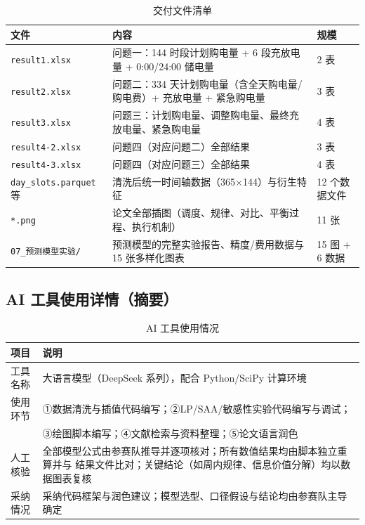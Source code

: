 \documentclass[withoutpreface,bwprint]{cumcmthesis}
\begin{document}
\begin{table}[htbp]
\centering
\caption{交付文件清单}
\label{tab:deliver}
\begin{tabularx}{\textwidth}{@{}lLl@{}}
\toprule
文件 & 内容 & 规模 \\
\midrule
\texttt{result1.xlsx} & 问题一：144 时段计划购电量 + 6 段充放电量 + 0:00/24:00 储电量 & 2 表 \\
\texttt{result2.xlsx} & 问题二：334 天计划购电量（含全天购电量/购电费）+ 充放电量 + 紧急购电量 & 3 表 \\
\texttt{result3.xlsx} & 问题三：计划购电量、调整购电量、最终充放电量、紧急购电量 & 4 表 \\
\texttt{result4-2.xlsx} & 问题四（对应问题二）全部结果 & 3 表 \\
\texttt{result4-3.xlsx} & 问题四（对应问题三）全部结果 & 4 表 \\
\texttt{day\_slots.parquet} 等 & 清洗后统一时间轴数据（365$\times$144）与衍生特征 & 12 个数据文件 \\
\texttt{*.png} & 论文全部插图（调度、规律、对比、平衡过程、执行机制） & 11 张 \\
\texttt{07\_预测模型实验/} & 预测模型的完整实验报告、精度/费用数据与 15 张多样化图表 & 15 图 $+$ 6 数据 \\
\bottomrule
\end{tabularx}
\end{table}

\subsection{AI 工具使用详情（摘要）}

\begin{table}[htbp]
\centering
\caption{AI 工具使用情况}
\label{tab:ai}
\begin{tabularx}{\textwidth}{@{}p{3.2cm}X@{}}
\toprule
项目 & 说明 \\
\midrule
工具名称 & 大语言模型（DeepSeek 系列），配合 Python/SciPy 计算环境 \\
使用环节 & ①数据清洗与插值代码编写；②LP/SAA/敏感性实验代码编写与调试；\\
 & ③绘图脚本编写；④文献检索与资料整理；⑤论文语言润色 \\
人工核验 & 全部模型公式由参赛队推导并逐项核对；所有数值结果均由脚本独立重算并与
结果文件比对；关键结论（如周内规律、信息价值分解）均以数据图表复核 \\
采纳情况 & 采纳代码框架与润色建议；模型选型、口径假设与结论均由参赛队主导确定 \\
\bottomrule
\end{tabularx}
\end{table}
\end{document}

